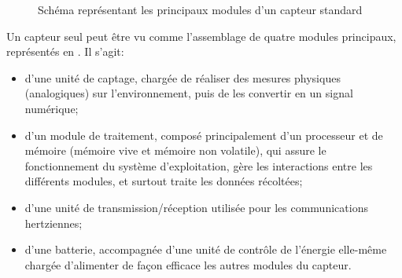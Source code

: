 \begin{figure}[H]
    \centering
    \caption{Schéma représentant les principaux modules d'un capteur standard}\label{st:fig:sensor}
\end{figure}
Un capteur seul peut être vu comme l'assemblage de quatre modules principaux, représentés en .
Il s'agit:
\begin{itemize}
    \item d'une unité de captage, chargée de réaliser des mesures physiques (analogiques) sur l'environnement, puis de les convertir en un signal numérique;
    \item d'un module de traitement, composé principalement d'un processeur et de mémoire (mémoire vive et mémoire non volatile), qui assure le fonctionnement du système d'exploitation, gère les interactions entre les différents modules, et surtout traite les données récoltées;
    \item d'une unité de transmission/réception utilisée pour les communications hertziennes;
    \item d'une batterie, accompagnée d'une unité de contrôle de l'énergie elle-même chargée d'alimenter de façon efficace les autres modules du capteur.
\end{itemize}

